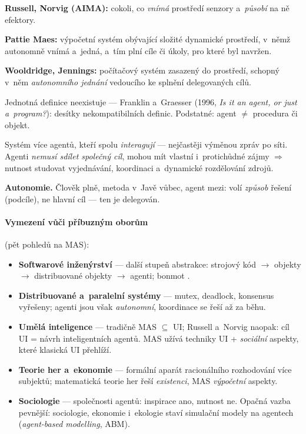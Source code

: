 \documentclass[11pt,a4paper]{article}
\theoremstyle{definition}
\begin{document}
\begin{defbox}
\textbf{Russell, Norvig (AIMA):} cokoli, co \emph{vnímá} prostředí senzory a~\emph{působí} na
ně efektory.

\textbf{Pattie Maes:} výpočetní systém obývající složité dynamické prostředí, v~němž autonomně
vnímá a~jedná, a~tím plní cíle či úkoly, pro které byl navržen.

\textbf{Wooldridge, Jennings:} počítačový systém zasazený do prostředí, schopný v~něm
\emph{autonomního jednání} vedoucího ke splnění delegovaných cílů.
\end{defbox}

Jednotná definice neexistuje --- Franklin a~Graesser (1996, \emph{Is it an agent, or just
a~program?}): desítky nekompatibilních definic. Podstatné: agent $\ne$ procedura či objekt.

\begin{defbox}
Systém více agentů, kteří spolu \emph{interagují} --- nejčastěji výměnou zpráv po síti.
Agenti \emph{nemusí sdílet společný cíl}, mohou mít vlastní i~protichůdné zájmy $\Rightarrow$
nutnost studovat vyjednávání, koordinaci a~dynamické rozdělování zdrojů.
\end{defbox}

\textbf{Autonomie.} Člověk plně, metoda v~Javě vůbec, agent mezi: volí \emph{způsob} řešení
(podcíle), ne hlavní cíl --- ten je delegován.

\paragraph{Vymezení vůči příbuzným oborům} (pět pohledů na MAS):
\begin{itemize}
\item \textbf{Softwarové inženýrství} --- další stupeň abstrakce: strojový kód $\to$ objekty
  $\to$ distribuované objekty $\to$ agenti; bonmot .
\item \textbf{Distribuované a~paralelní systémy} --- mutex, deadlock, konsensus vyřešeny; agenti
  jsou však \emph{autonomní}, koordinace se řeší až za běhu.
\item \textbf{Umělá inteligence} --- tradičně MAS $\subseteq$ UI; Russell a~Norvig naopak: cíl
  UI = návrh inteligentních agentů. MAS užívá techniky UI + \emph{sociální} aspekty, které
  klasická UI přehlíží.
\item \textbf{Teorie her a~ekonomie} --- formální aparát racionálního rozhodování více subjektů;
  matematická teorie her řeší \emph{existenci}, MAS \emph{výpočetní} aspekty.
\item \textbf{Sociologie} --- společnosti agentů: inspirace ano, nutnost ne. Opačná vazba
  pevnější: sociologie, ekonomie i~ekologie staví simulační modely na agentech
  (\emph{agent-based modelling}, ABM).
\end{itemize}
\end{document}
